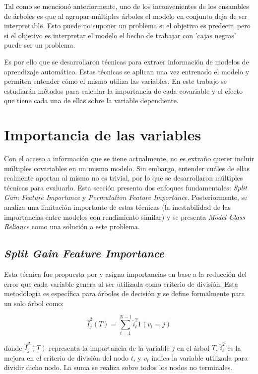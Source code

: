 Tal como se mencionó anteriormente, uno de los inconvenientes de los ensambles de árboles es que al agrupar múltiples árboles el modelo en conjunto deja de ser interpretable. Esto puede no suponer un problema si el objetivo es predecir, pero si el objetivo es interpretar el modelo el hecho de trabajar con 'cajas negras' puede ser un problema.

Es por ello que se desarrollaron técnicas para extraer información de modelos de aprendizaje automático. Estas técnicas se aplican una vez entrenado el modelo y permiten entender cómo el mismo utiliza las variables. En este trabajo se estudiarán métodos para calcular la importancia de cada covariable y el efecto que tiene cada una de ellas sobre la variable dependiente.

\section{Importancia de las variables}

Con el acceso a información que se tiene actualmente, no es extraño querer incluir múltiples covariables en un mismo modelo. Sin embargo, entender cuáles de ellas realmente aportan al mismo no es trivial, por lo que se desarrollaron múltiples técnicas para evaluarlo. Esta sección presenta dos enfoques fundamentales: \textit{Split Gain Feature Importance} y \textit{Permutation Feature Importance}. Posteriormente, se analiza una limitación importante de estas técnicas (la inestabilidad de las importancias entre modelos con rendimiento similar) y se presenta \textit{Model Class Reliance} como una solución a este problema.

\subsection{\textit{Split Gain Feature Importance}}

Esta técnica fue propuesta por \cite{friedman_2001} y asigna importancias en base a la reducción del error que cada variable genera al ser utilizada como criterio de división. Esta metodología es específica para árboles de decisión y se define formalmente para un solo árbol como:
 
\begin{equation}
    \label{eq:split-importance}
\hat{I}_j^{2}(T)=\sum_{t=1}^{N-1}\hat{i}_t^{2}1(v_t=j)    
\end{equation}

donde $\hat{I}_j^{2}(T)$ representa la importancia de la variable $j$ en el árbol $T$, $\hat{i}_t^{2}$ es la mejora en el criterio de división del nodo $t$, y $v_t$ indica la variable utilizada para dividir dicho nodo. La suma se realiza sobre todos los nodos no terminales.

